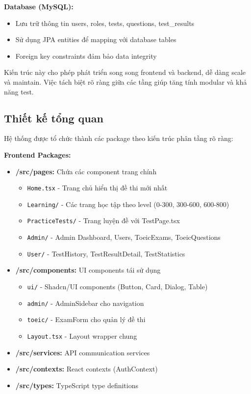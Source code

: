\documentclass[../DoAn.tex]{subfiles}
\begin{document}
\textbf{Database (MySQL):}
\begin{itemize}
    \item Lưu trữ thông tin users, roles, tests, questions, test\_results
    \item Sử dụng JPA entities để mapping với database tables
    \item Foreign key constraints đảm bảo data integrity
\end{itemize}

Kiến trúc này cho phép phát triển song song frontend và backend, dễ dàng scale và maintain. Việc tách biệt rõ ràng giữa các tầng giúp tăng tính modular và khả năng test.

\subsection{Thiết kế tổng quan}

Hệ thống được tổ chức thành các package theo kiến trúc phân tầng rõ ràng:

\textbf{Frontend Packages:}
\begin{itemize}
    \item \textbf{/src/pages:} Chứa các component trang chính
    \begin{itemize}
        \item \texttt{Home.tsx} - Trang chủ hiển thị đề thi mới nhất
        \item \texttt{Learning/} - Các trang học tập theo level (0-300, 300-600, 600-800)
        \item \texttt{PracticeTests/} - Trang luyện đề với TestPage.tsx
        \item \texttt{Admin/} - Admin Dashboard, Users, ToeicExams, ToeicQuestions
        \item \texttt{User/} - TestHistory, TestResultDetail, TestStatistics
    \end{itemize}
    \item \textbf{/src/components:} UI components tái sử dụng
    \begin{itemize}
        \item \texttt{ui/} - Shadcn/UI components (Button, Card, Dialog, Table)
        \item \texttt{admin/} - AdminSidebar cho navigation
        \item \texttt{toeic/} - ExamForm cho quản lý đề thi
        \item \texttt{Layout.tsx} - Layout wrapper chung
    \end{itemize}
    \item \textbf{/src/services:} API communication services
    \item \textbf{/src/contexts:} React contexts (AuthContext)
    \item \textbf{/src/types:} TypeScript type definitions
\end{itemize}
\end{document}
